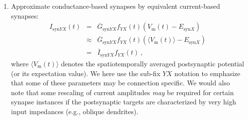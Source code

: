 \begin{enumerate}
\item Approximate conductance-based synapses by equivalent current-based synapses:
\begin{eqnarray}
I_{\text{syn}YX}(t)
	&=& \overline{G}_{\text{syn}YX}f_{YX}(t)\left(V_\text{m}(t) - E_{\text{syn}X}\right) \\
	&\approx& \overline{G}_{\text{syn}YX}f_{YX}(t)\left(\langle V_\text{m}(t) \rangle - E_{\text{syn}X}\right) \\
	&=& \overline{I}_{\text{syn}YX}f_{YX}(t)~,
\end{eqnarray}
where $\langle V_\text{m}(t) \rangle$ denotes the spatiotemporally averaged postsynaptic potential (or its expectation value).
We here use the sub-fix $YX$ notation to emphasize that some of these parameters may be connection specific.
We would also note that some rescaling of current amplitudes \emph{may} be required for certain synapse instances if the postsynaptic targets are characterized by very high input impedances (e.g., oblique dendrites).


\end{enumerate}
